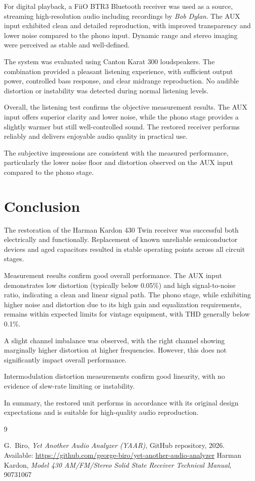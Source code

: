 \documentclass[]{article}
\begin{document}
For digital playback, a FiiO BTR3 Bluetooth receiver was used as a source, streaming high-resolution audio including recordings by \textit{Bob Dylan}. The AUX input exhibited clean and detailed reproduction, with improved transparency and lower noise compared to the phono input. Dynamic range and stereo imaging were perceived as stable and well-defined.

The system was evaluated using Canton Karat 300 loudspeakers. The combination provided a pleasant listening experience, with sufficient output power, controlled bass response, and clear midrange reproduction. No audible distortion or instability was detected during normal listening levels.

Overall, the listening test confirms the objective measurement results. The AUX input offers superior clarity and lower noise, while the phono stage provides a slightly warmer but still well-controlled sound. The restored receiver performs reliably and delivers enjoyable audio quality in practical use.

The subjective impressions are consistent with the measured performance, particularly the lower noise floor and distortion observed on the AUX input compared to the phono stage.

\section{Conclusion}

The restoration of the Harman Kardon 430 Twin receiver was successful both electrically and functionally. Replacement of known unreliable semiconductor devices and aged capacitors resulted in stable operating points across all circuit stages.

Measurement results confirm good overall performance. The AUX input demonstrates low distortion (typically below 0.05\%) and high signal-to-noise ratio, indicating a clean and linear signal path. The phono stage, while exhibiting higher noise and distortion due to its high gain and equalization requirements, remains within expected limits for vintage equipment, with THD generally below 0.1\%.

A slight channel imbalance was observed, with the right channel showing marginally higher distortion at higher frequencies. However, this does not significantly impact overall performance.

Intermodulation distortion measurements confirm good linearity, with no evidence of slew-rate limiting or instability.

In summary, the restored unit performs in accordance with its original design expectations and is suitable for high-quality audio reproduction.

\begin{thebibliography}{9}

G.~Biro, \textit{Yet Another Audio Analyzer (YAAR)}, GitHub repository, 2026. Available: \url{https://github.com/george-biro/yet-another-audio-analyzer}
Harman Kardon, \textit{Model 430 AM/FM/Stereo Solid State Receiver Technical Manual}, 90731067

\end{thebibliography}
\end{document}
